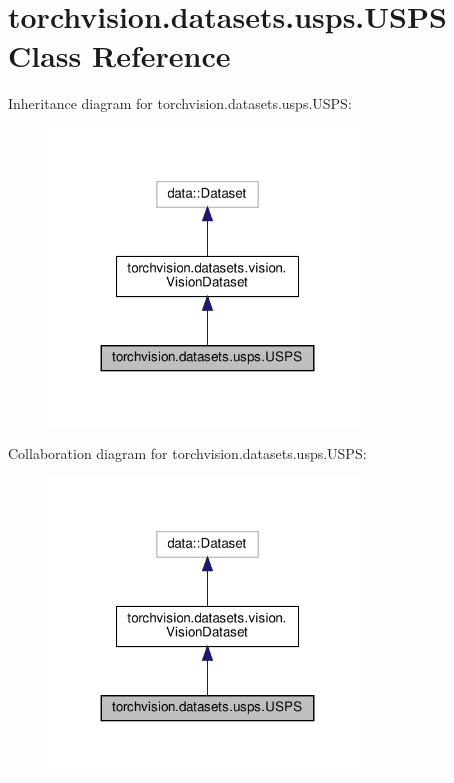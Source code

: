 \hypertarget{classtorchvision_1_1datasets_1_1usps_1_1USPS}{}\section{torchvision.\+datasets.\+usps.\+U\+S\+PS Class Reference}
\label{classtorchvision_1_1datasets_1_1usps_1_1USPS}


Inheritance diagram for torchvision.\+datasets.\+usps.\+U\+S\+PS\+:
\nopagebreak
\begin{figure}[H]
\begin{center}
\leavevmode
\includegraphics[width=239pt]{classtorchvision_1_1datasets_1_1usps_1_1USPS__inherit__graph}
\end{center}
\end{figure}


Collaboration diagram for torchvision.\+datasets.\+usps.\+U\+S\+PS\+:
\nopagebreak
\begin{figure}[H]
\begin{center}
\leavevmode
\includegraphics[width=239pt]{classtorchvision_1_1datasets_1_1usps_1_1USPS__coll__graph}
\end{center}
\end{figure}
